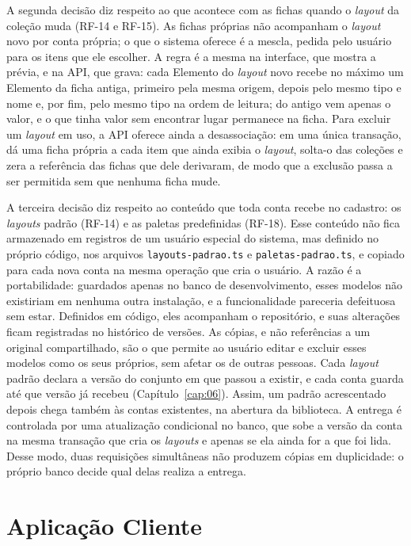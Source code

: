 A segunda decisão diz respeito ao que acontece com as fichas quando o \textit{layout} da coleção muda (RF-14 e RF-15). As fichas próprias não acompanham o \textit{layout} novo por conta própria; o que o sistema oferece é a mescla, pedida pelo usuário para os itens que ele escolher. A regra é a mesma na interface, que mostra a prévia, e na API, que grava: cada Elemento do \textit{layout} novo recebe no máximo um Elemento da ficha antiga, primeiro pela mesma origem, depois pelo mesmo tipo e nome e, por fim, pelo mesmo tipo na ordem de leitura; do antigo vem apenas o valor, e o que tinha valor sem encontrar lugar permanece na ficha. Para excluir um \textit{layout} em uso, a API oferece ainda a desassociação: em uma única transação, dá uma ficha própria a cada item que ainda exibia o \textit{layout}, solta-o das coleções e zera a referência das fichas que dele derivaram, de modo que a exclusão passa a ser permitida sem que nenhuma ficha mude.

A terceira decisão diz respeito ao conteúdo que toda conta recebe no cadastro: os \textit{layouts} padrão (RF-14) e as paletas predefinidas (RF-18). Esse conteúdo não fica armazenado em registros de um usuário especial do sistema, mas definido no próprio código, nos arquivos \texttt{layouts-padrao.ts} e \texttt{paletas-padrao.ts}, e copiado para cada nova conta na mesma operação que cria o usuário. A razão é a portabilidade: guardados apenas no banco de desenvolvimento, esses modelos não existiriam em nenhuma outra instalação, e a funcionalidade pareceria defeituosa sem estar. Definidos em código, eles acompanham o repositório, e suas alterações ficam registradas no histórico de versões. As cópias, e não referências a um original compartilhado, são o que permite ao usuário editar e excluir esses modelos como os seus próprios, sem afetar os de outras pessoas. Cada \textit{layout} padrão declara a versão do conjunto em que passou a existir, e cada conta guarda até que versão já recebeu (Capítulo~\ref{cap:06}). Assim, um padrão acrescentado depois chega também às contas existentes, na abertura da biblioteca. A entrega é controlada por uma atualização condicional no banco, que sobe a versão da conta na mesma transação que cria os \textit{layouts} e apenas se ela ainda for a que foi lida. Desse modo, duas requisições simultâneas não produzem cópias em duplicidade: o próprio banco decide qual delas realiza a entrega.

\section{Aplicação Cliente}
\label{sec:aplicacaoCliente}

